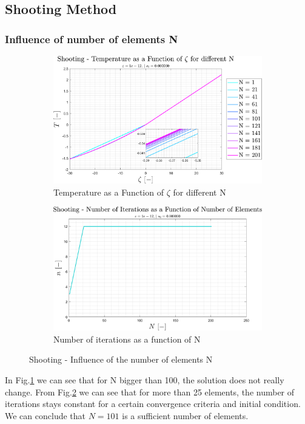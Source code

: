 \documentclass[11pt, a4paper]{article}
\begin{document}
\subsection{Shooting Method}
\subsubsection{Influence of number of elements N}
\begin{figure}[H]
    \centering
    \begin{subfigure}[c]{0.49\textwidth}
        \centering
        \includegraphics[width=\textwidth]{images/shooting - T vs zeta for diff N.png}
        \caption{Temperature as a Function of $\zeta$ for different N}
        \label{fig: shooting - T vs zeta for diff N}
    \end{subfigure}
    \hfill
    \begin{subfigure}[c]{0.49\textwidth}
        \centering
        \includegraphics[width=\textwidth]{images/shooting - n vs N.png}
        \caption{Number of iterations as a function of N}
        \label{fig: shooting - n vs N}
    \end{subfigure}
    \caption{Shooting - Influence of the number of elements N}
    \label{fig: shooting - Influence of N}
\end{figure}
In Fig.\ref{fig: shooting - T vs zeta for diff N} we can see that for N bigger than 100, the solution does not really change. From Fig.\ref{fig: shooting - n vs N} we can see that for more than 25 elements, the number of iterations stays constant for a certain convergence criteria and initial condition. We can conclude that $N=101$ is a sufficient number of elements.
\end{document}
